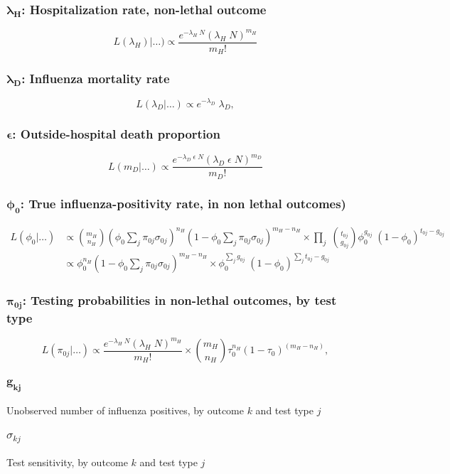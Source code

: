 \documentclass{article}[12pt]
\begin{document}
\subsubsection*{$\bm{\lambda_H}$: Hospitalization rate, non-lethal outcome}
%
\begin{equation}
\label{eq:lam_H}
L(\lambda_H)|\ldots) \propto \frac{e^{-\lambda_H \; N} (\lambda_H \; N)^{m_H}}{m_H!}
\end{equation}
%
\subsubsection*{$\bm{\lambda_D}$: Influenza mortality rate}
%
\begin{equation}
\label{eq:lam_D}
L(\lambda_D|\ldots) \propto e^{-\lambda_D}\;\lambda_D ,
\end{equation}
%
\subsubsection*{$\bm{\epsilon}$: Outside-hospital death proportion}
%
\begin{equation}
\label{eq:p_osh}
L(m_D|\ldots) \propto \frac{e^{-\lambda_D\;\epsilon  \; N} (\lambda_D\;\epsilon  \; N)^{m_D}}{m_D!}
\end{equation}
%
\subsubsection*{$\bm{\phi_0}$: True influenza-positivity rate, in non lethal outcomes)}
%
\begin{align}
\nonumber
L(\phi_0|\ldots) &\propto \binom{m_H}{n_H} \left(\phi_0 \sum_{j} \pi_{0j} \sigma_{0j}\right)^{n_H} (1 - \phi_0 \sum_{j} \pi_{0j} \sigma_{0j})^{m_H - n_H} \times
\prod_j\;\binom{t_{0j}}{g_{0j}} \phi_0^{g_{0j}} \;(1 - \phi_0)^{t_{0j} - g_{0j}} \\
\label{eq:phi_0}
 &\propto \phi_0^{n_H} \left(1 - \phi_0 \sum_{j} \pi_{0j} \sigma_{0j}\right)^{m_H - n_H} \times
 \phi_0^{\sum_j g_{0j}} \;(1 - \phi_0)^{\sum_j t_{0j} - g_{0j}} 
\end{align}
%

\subsubsection*{$\bm{\pi_{0j}}$: Testing probabilities in non-lethal outcomes, by test type}
%
\begin{equation}
\label{eq:pi_kj}
L(\pi_{0j}|\ldots) \propto \frac{e^{-\lambda_H \; N} (\lambda_H \; N)^{m_H}}{m_H!}\times \binom{m_H}{n_H} \tau_0^{n_H} (1 - \tau_0)^{(m_H - n_H)},
\end{equation}
%
	
\subsubsection*{$\bm{g_{kj}}$} Unobserved number of influenza positives, by outcome $k$ and test type $j$
\subsubsection*{$\sigma_{kj}$} Test sensitivity, by outcome $k$ and test type $j$
%
\end{document}

